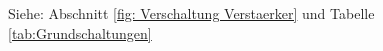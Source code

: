 { %
%        
%        
%        
%        
%        
%        
%        
%        
%        
%        
%        
%        
%        
Siehe: Abschnitt \ref{fig: Verschaltung Verstaerker} und Tabelle \ref{tab:Grundschaltungen}
}